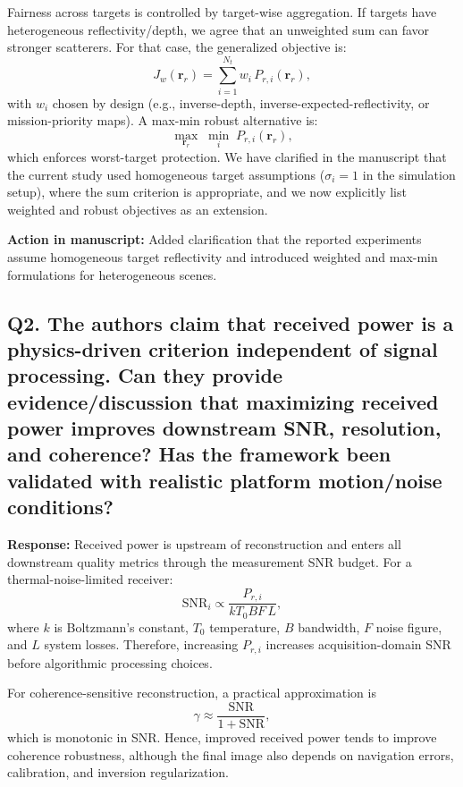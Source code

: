 \documentclass[11pt]{article}
\begin{document}
Fairness across targets is controlled by target-wise aggregation. If targets have heterogeneous reflectivity/depth, we agree that an unweighted sum can favor stronger scatterers. For that case, the generalized objective is:
\begin{equation}
J_w(\bm r_r)=\sum_{i=1}^{N_t} w_i\,P_{r,i}(\bm r_r),
\end{equation}
with $w_i$ chosen by design (e.g., inverse-depth, inverse-expected-reflectivity, or mission-priority maps). A max-min robust alternative is:
\begin{equation}
\max_{\bm r_r}\;\min_i\;P_{r,i}(\bm r_r),
\end{equation}
which enforces worst-target protection. We have clarified in the manuscript that the current study used homogeneous target assumptions ($\sigma_i=1$ in the simulation setup), where the sum criterion is appropriate, and we now explicitly list weighted and robust objectives as an extension.

\textbf{Action in manuscript:} Added clarification that the reported experiments assume homogeneous target reflectivity and introduced weighted and max-min formulations for heterogeneous scenes.

\subsection*{Q2. The authors claim that received power is a physics-driven criterion independent of signal processing. Can they provide evidence/discussion that maximizing received power improves downstream SNR, resolution, and coherence? Has the framework been validated with realistic platform motion/noise conditions?}
\textbf{Response:} Received power is upstream of reconstruction and enters all downstream quality metrics through the measurement SNR budget. For a thermal-noise-limited receiver:
\begin{equation}
\mathrm{SNR}_i \propto \frac{P_{r,i}}{kT_0BF\,L},
\end{equation}
where $k$ is Boltzmann's constant, $T_0$ temperature, $B$ bandwidth, $F$ noise figure, and $L$ system losses. Therefore, increasing $P_{r,i}$ increases acquisition-domain SNR before algorithmic processing choices.

For coherence-sensitive reconstruction, a practical approximation is
\begin{equation}
\gamma \approx \frac{\mathrm{SNR}}{1+\mathrm{SNR}},
\end{equation}
which is monotonic in SNR. Hence, improved received power tends to improve coherence robustness, although the final image also depends on navigation errors, calibration, and inversion regularization.
\end{document}
